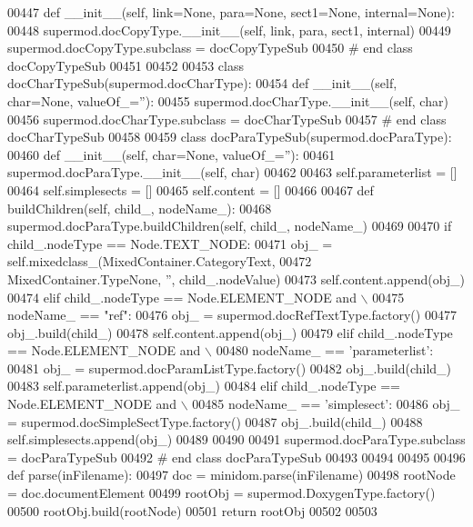 \begin{DoxyCode}
00447     \textcolor{keyword}{def }__init__(self, link=None, para=None, sect1=None, internal=None):
00448         supermod.docCopyType.\_\_init\_\_(self, link, para, sect1, internal)
00449 supermod.docCopyType.subclass = docCopyTypeSub
00450 \textcolor{comment}{# end class docCopyTypeSub}
00451 
00452 
00453 \textcolor{keyword}{class }docCharTypeSub(supermod.docCharType):
00454     \textcolor{keyword}{def }__init__(self, char=None, valueOf\_=''):
00455         supermod.docCharType.\_\_init\_\_(self, char)
00456 supermod.docCharType.subclass = docCharTypeSub
00457 \textcolor{comment}{# end class docCharTypeSub}
00458 
00459 \textcolor{keyword}{class }docParaTypeSub(supermod.docParaType):
00460     \textcolor{keyword}{def }__init__(self, char=None, valueOf\_=''):
00461         supermod.docParaType.\_\_init\_\_(self, char)
00462 
00463         self.parameterlist = []
00464         self.simplesects = []
00465         self.content = []
00466 
00467     \textcolor{keyword}{def }buildChildren(self, child\_, nodeName\_):
00468         supermod.docParaType.buildChildren(self, child\_, nodeName\_)
00469 
00470         \textcolor{keywordflow}{if} child\_.nodeType == Node.TEXT\_NODE:
00471             obj\_ = self.mixedclass\_(MixedContainer.CategoryText,
00472                 MixedContainer.TypeNone, \textcolor{stringliteral}{''}, child\_.nodeValue)
00473             self.content.append(obj\_)
00474         \textcolor{keywordflow}{elif} child\_.nodeType == Node.ELEMENT\_NODE \textcolor{keywordflow}{and} \(\backslash\)
00475                 nodeName\_ == \textcolor{stringliteral}{"ref"}:
00476             obj\_ = supermod.docRefTextType.factory()
00477             obj\_.build(child\_)
00478             self.content.append(obj\_)
00479         \textcolor{keywordflow}{elif} child\_.nodeType == Node.ELEMENT\_NODE \textcolor{keywordflow}{and} \(\backslash\)
00480                 nodeName\_ == \textcolor{stringliteral}{'parameterlist'}:
00481             obj\_ = supermod.docParamListType.factory()
00482             obj\_.build(child\_)
00483             self.parameterlist.append(obj\_)
00484         \textcolor{keywordflow}{elif} child\_.nodeType == Node.ELEMENT\_NODE \textcolor{keywordflow}{and} \(\backslash\)
00485                 nodeName\_ == \textcolor{stringliteral}{'simplesect'}:
00486             obj\_ = supermod.docSimpleSectType.factory()
00487             obj\_.build(child\_)
00488             self.simplesects.append(obj\_)
00489 
00490 
00491 supermod.docParaType.subclass = docParaTypeSub
00492 \textcolor{comment}{# end class docParaTypeSub}
00493 
00494 
00495 
00496 \textcolor{keyword}{def }parse(inFilename):
00497     doc = minidom.parse(inFilename)
00498     rootNode = doc.documentElement
00499     rootObj = supermod.DoxygenType.factory()
00500     rootObj.build(rootNode)
00501     \textcolor{keywordflow}{return} rootObj
00502 
00503 
\end{DoxyCode}
